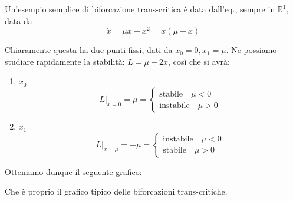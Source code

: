 \documentclass{report}
\begin{document}
\begin{example}
    Un'esempio semplice di biforcazione trans-critica è data dall'eq., sempre in $\mathbb{R}^1$, data da 
    \begin{equation}
        \dot{x} = \mu x - x^2 = x(\mu -x)
    \end{equation}

    Chiaramente questa ha due punti fissi, dati da $x_0 =0, x_1 = \mu$. Ne possiamo studiare rapidamente la stabilità: $L = \mu - 2x$, così che si avrà: 

    \begin{enumerate}
        \item $x_0$ \\
        \begin{equation}
            L|_{x=0} = \mu = 
            \begin{cases}
                \text{stabile} \quad \mu <0 \\ \text{instabile} \quad \mu >0 
            \end{cases}
        \end{equation}
        \item $x_1$ \\
        \begin{equation}
            L|_{x=\mu} = -\mu = \begin{cases}
                \text{instabile} \quad \mu <0 \\ \text{stabile} \quad \mu >0 
            \end{cases}
        \end{equation}
    \end{enumerate}

    Otteniamo dunque il seguente grafico: 
    \begin{center}
    \end{center}

    Che è proprio il grafico tipico delle biforcazioni trans-critiche. 
\end{example}
\end{document}
